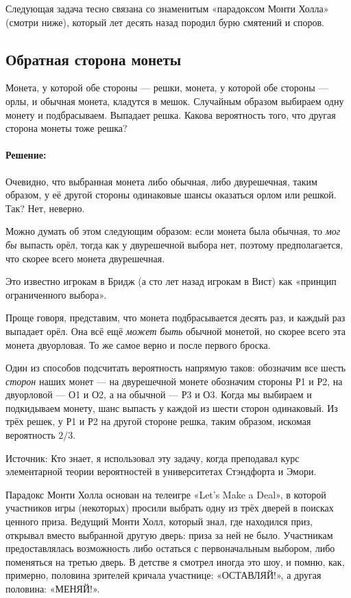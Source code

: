 \medskip

Следующая задача тесно связана со знаменитым «парадоксом Монти Холла» (смотри ниже), который лет десять назад породил бурю смятений и споров.

\subsection*{Обратная сторона монеты}%

Монета, у которой обе стороны --- решки, монета, у которой обе стороны --- орлы, и обычная монета, кладутся в мешок.
Случайным образом выбираем одну монету и подбрасываем.
Выпадает решка.
Какова вероятность того, что другая сторона монеты тоже решка?

\paragraph{Решение:}
Очевидно, что выбранная монета либо обычная, либо двурешечная, таким образом, у её другой стороны одинаковые шансы оказаться орлом или решкой.
Так?
Нет, неверно.

Можно думать об этом следующим образом: если монета была обычная, то \emph{мог бы} выпасть орёл, тогда как у двурешечной выбора нет, поэтому предполагается, что скорее всего монета двурешечная.

Это известно игрокам в Бридж (а сто лет назад игрокам в Вист) как «принцип ограниченного выбора».

Проще говоря, представим, что монета подбрасывается десять раз, и каждый раз выпадает орёл.
Она всё ещё \emph{может быть} обычной монетой, но скорее всего эта монета двуорловая.
То же самое верно и после первого броска.

Один из способов подсчитать вероятность напрямую таков:
обозначим все шесть \emph{сторон} наших монет ---
на двурешечной монете обозначим стороны Р1 и Р2, на двуорловой --- О1 и О2, а на обычной --- Р3 и О3.
Когда мы выбираем и подкидываем монету, шанс выпасть у каждой из шести сторон одинаковый.
Из трёх решек, у Р1 и Р2 на другой стороне решка, таким образом, искомая вероятность $2/3$.\heart

Источник: Кто знает, я использовал эту задачу, когда преподавал курс элементарной теории вероятностей в университетах Стэндфорта и Эмори.

\medskip

Парадокс Монти Холла основан на телеигре «Let’s Make a Deal», в которой участников игры (некоторых) просили выбрать одну из трёх дверей в поисках ценного приза.
Ведущий Монти Холл, который знал, где находился приз, открывал вместо выбранной другую дверь: приза за ней не было.
Участникам предоставлялась возможность либо остаться с первоначальным выбором, либо поменяться на третью дверь.
В детстве я смотрел иногда это шоу, и помню, как, примерно, половина зрителей кричала участнице: «ОСТАВЛЯЙ!», а другая половина: «МЕНЯЙ!».

